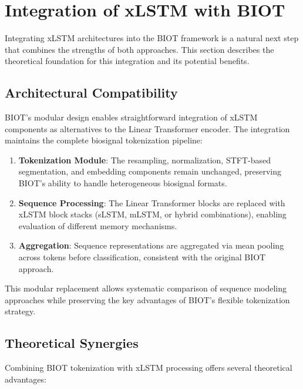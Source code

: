 \section{Integration of xLSTM with BIOT}
\label{sec:background:integration}

Integrating \ac{xLSTM} architectures into the \ac{BIOT} framework is a natural next step that combines the strengths of both approaches. This section describes the theoretical foundation for this integration and its potential benefits.

\subsection{Architectural Compatibility}

\ac{BIOT}'s modular design enables straightforward integration of \ac{xLSTM} components as alternatives to the Linear Transformer encoder. The integration maintains the complete biosignal tokenization pipeline:

\begin{enumerate}
    \item \textbf{Tokenization Module}: The resampling, normalization, \ac{STFT}-based segmentation, and embedding components remain unchanged, preserving \ac{BIOT}'s ability to handle heterogeneous biosignal formats.
    
    \item \textbf{Sequence Processing}: The Linear Transformer blocks are replaced with \ac{xLSTM} block stacks (\ac{sLSTM}, \ac{mLSTM}, or hybrid combinations), enabling evaluation of different memory mechanisms.
    
    \item \textbf{Aggregation}: Sequence representations are aggregated via mean pooling across tokens before classification, consistent with the original \ac{BIOT} approach.
\end{enumerate}

This modular replacement allows systematic comparison of sequence modeling approaches while preserving the key advantages of \ac{BIOT}'s flexible tokenization strategy.

\subsection{Theoretical Synergies}

Combining \ac{BIOT} tokenization with \ac{xLSTM} processing offers several theoretical advantages:


